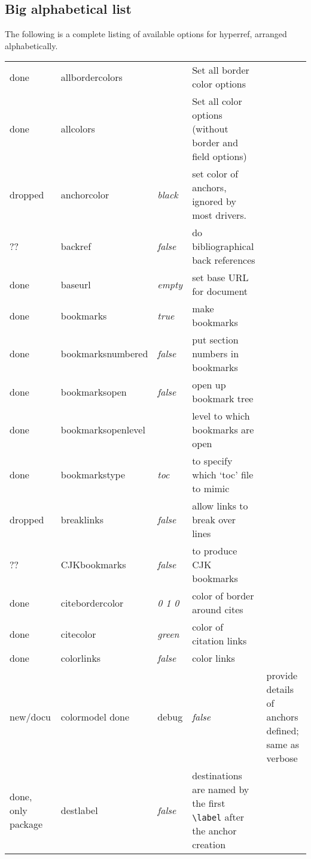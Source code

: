 \subsection{Big alphabetical list}

The following is a complete listing of available options for
\textsf{hyperref}, arranged alphabetically.

\begin{longtable}{@{}l>{\ttfamily}llp{7cm}@{}}
done    & allbordercolors    &                        & Set all border color options\\
done    & allcolors          &                        & Set all color options (without border and field options)\\
dropped & anchorcolor        & \textit{black}         & set color of anchors, ignored by most drivers. \\
??      & backref            & \textit{false}         & do bibliographical back references \\
done    & baseurl            & \textit{empty}         & set base URL for document \\
done    & bookmarks          & \textit{true}          & make bookmarks \\
done    & bookmarksnumbered  & \textit{false}         & put section numbers in bookmarks \\
done    & bookmarksopen      & \textit{false}         & open up bookmark tree \\
done    & bookmarksopenlevel & \ttfamily{} & level to which bookmarks are open \\
done    & bookmarkstype      & \textit{toc}           & to specify which `toc' file to mimic \\
dropped & breaklinks         & \textit{false}         & allow links to break over lines \\
?? & CJKbookmarks       & \textit{false}         & to produce CJK bookmarks\\
done & citebordercolor    & \textit{0 1 0}         & color of border around cites \\
done & citecolor          & \textit{green}         & color of citation links \\
done & colorlinks         & \textit{false}         & color links \\
new/docu  & colormodel         
done   & debug              & \textit{false}         & provide details of anchors defined; same as verbose \\
done, only package   & destlabel          & \textit{false}         & destinations are named by the first \verb|\label| after the anchor creation \\

\end{longtable}

